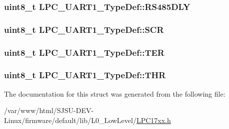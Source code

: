 \subsubsection[{\texorpdfstring{R\+S485\+D\+LY}{RS485DLY}}]{ uint8\+\_\+t L\+P\+C\+\_\+\+U\+A\+R\+T1\+\_\+\+Type\+Def\+::\+R\+S485\+D\+LY}\hypertarget{structLPC__UART1__TypeDef_ab89d9a8dbf2a31a1e3bf84326f5a4933}{}\label{structLPC__UART1__TypeDef_ab89d9a8dbf2a31a1e3bf84326f5a4933}
\subsubsection[{\texorpdfstring{S\+CR}{SCR}}]{ uint8\+\_\+t L\+P\+C\+\_\+\+U\+A\+R\+T1\+\_\+\+Type\+Def\+::\+S\+CR}\hypertarget{structLPC__UART1__TypeDef_a0c2ad43ebf02d695172065f5f2a71d59}{}\label{structLPC__UART1__TypeDef_a0c2ad43ebf02d695172065f5f2a71d59}
\subsubsection[{\texorpdfstring{T\+ER}{TER}}]{ uint8\+\_\+t L\+P\+C\+\_\+\+U\+A\+R\+T1\+\_\+\+Type\+Def\+::\+T\+ER}\hypertarget{structLPC__UART1__TypeDef_ae1d0d37313543a6e6c365c86763ed79b}{}\label{structLPC__UART1__TypeDef_ae1d0d37313543a6e6c365c86763ed79b}
\subsubsection[{\texorpdfstring{T\+HR}{THR}}]{ uint8\+\_\+t L\+P\+C\+\_\+\+U\+A\+R\+T1\+\_\+\+Type\+Def\+::\+T\+HR}\hypertarget{structLPC__UART1__TypeDef_a12e9a213fd67c6bed7ba73d8e811ea3a}{}\label{structLPC__UART1__TypeDef_a12e9a213fd67c6bed7ba73d8e811ea3a}


The documentation for this struct was generated from the following file\+:\begin{DoxyCompactItemize}
\item 
/var/www/html/\+S\+J\+S\+U-\/\+D\+E\+V-\/\+Linux/firmware/default/lib/\+L0\+\_\+\+Low\+Level/\hyperlink{LPC17xx_8h}{L\+P\+C17xx.\+h}\end{DoxyCompactItemize}
